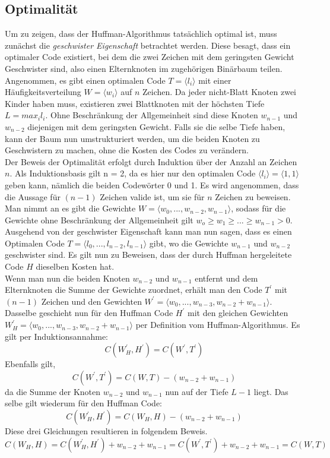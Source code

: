\documentclass[course=erap]{aspdoc}
\begin{document}
\subsection{Optimalität}

Um zu zeigen, dass der Huffman-Algorithmus tatsächlich optimal ist, muss zunächst die \textit{geschwister Eigenschaft} betrachtet werden.
Diese besagt, dass ein optimaler Code existiert, bei dem die zwei Zeichen mit dem geringsten Gewicht Geschwister sind, also einen Elternknoten im zugehörigen Binärbaum teilen.\\
Angenommen, es gibt einen optimalen Code $T = \langle l_i \rangle $ mit einer Häufigkeitsverteilung $W = \langle w_i \rangle $ auf $n$ Zeichen.
Da jeder nicht-Blatt Knoten zwei Kinder haben muss, existieren zwei Blattknoten mit der höchsten Tiefe $ L = max_i l_i$. Ohne Beschränkung der Allgemeinheit sind diese Knoten $w_{n-1}$ und $w_{n-2}$ diejenigen mit dem geringsten Gewicht. Falls sie die selbe Tiefe haben, kann der Baum nun umstrukturiert werden, um die beiden Knoten zu Geschwistern zu machen, ohne die Kosten des Codes zu verändern.\\
Der Beweis der Optimalität erfolgt durch Induktion über der Anzahl an Zeichen $n$. \cite{HufProof}
Als Induktionsbasis gilt n = 2, da es hier nur den optimalen Code $ \langle l_i \rangle = \langle 1, 1 \rangle $ geben kann, nämlich die beiden Codewörter 0 und 1.
Es wird angenommen, dass die Aussage für $(n-1)$ Zeichen valide ist, um sie für $n$ Zeichen zu beweisen.
Man nimmt an es gibt die Gewichte $W = \langle w_0,..., w_{n-2}, w_{n-1} \rangle $, sodass für die Gewichte ohne Beschränkung der Allgemeinheit gilt $w_o \ge w_1 \ge ... \ge w_{n-1} > 0$.\\
Ausgehend von der geschwister Eigenschaft kann man nun sagen, dass es einen Optimalen Code $T = \langle l_0,..., l_{n-2}, l_{n-1} \rangle$ gibt, wo die Gewichte $w_{n-1}$ und $w_{n-2}$ geschwister sind. Es gilt nun zu Beweisen, dass der durch Huffman hergeleitete Code $H$ dieselben Kosten hat.\\
Wenn man nun die beiden Knoten $w_{n-2}$ und $w_{n-1}$ entfernt und dem Elternknoten die Summe der Gewichte zuordnet, erhält man den Code $T^{\prime}$ mit $(n-1)$ Zeichen und den Gewichten $W^{\prime} = \langle w_0,..., w_{n-3}, w_{n-2} + w_{n-1} \rangle$.
Dasselbe geschieht nun für den Huffman Code $H^{\prime}$ mit den gleichen Gewichten $W_H^{\prime} = \langle w_0,..., w_{n-3}, w_{n-2} + w_{n-1} \rangle $ per Definition vom Huffman-Algorithmus.
Es gilt per Induktionsannahme: 
$$C(W_H^{\prime}, H^{\prime}) = C(W^\prime, T^{\prime})$$
Ebenfalls gilt,
$$ C(W^\prime, T^{\prime}) = C(W, T) - (w_{n-2} + w_{n-1})$$
da die Summe der Knoten $w_{n-2}$ und $w_{n-1}$ nun auf der Tiefe $L-1$ liegt.
Das selbe gilt wiederum für den Huffman Code:
$$ C(W_H^\prime, H^{\prime}) = C(W_H, H) - (w_{n-2} + w_{n-1})$$
Diese drei Gleichungen resultieren in folgendem Beweis.
$$ C(W_H, H) = C(W_H^\prime, H^{\prime}) + w_{n-2} + w_{n-1} = C(W^\prime, T^{\prime}) + w_{n-2} + w_{n-1} = C(W, T) $$
\end{document}
